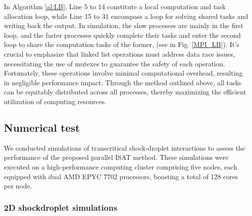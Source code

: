 In Algorithm \ref{al:LB}, Line 5 to 14 constitute a local computation and task allocation loop, while Line 15 to 31 encompass a loop for solving shared tasks and writing back the output. In simulation, the slow processes are mainly in the first loop, and the faster processes quickly complete their tasks and enter the second loop to share the computation tasks of the former, (see in Fig. \ref{MPI_LB}).  %
It's crucial to emphasize that linked list operations must address data race issues, necessitating the use of mutexes to guarantee the safety of each operation. Fortunately, these operations involve minimal computational overhead, resulting in negligible performance impact.
Through the method outlined above, all tasks can be equitably distributed across all processes, thereby maximizing the efficient utilization of computing resources.


\subsection{Numerical test}
We conducted simulations of transcritical shock-droplet interactions to assess the performance of the proposed parallel ISAT method. These simulations were executed on a high-performance computing cluster comprising five nodes, each equipped with dual AMD EPYC 7702 processors, boasting a total of 128 cores per node.
\subsubsection{2D shockdroplet simulations}


